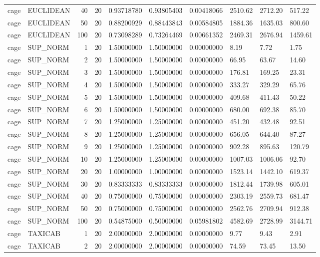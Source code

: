 \begin{longtable}{llrrllllll}
cage & EUCLIDEAN & 40 & 20 & 0.93718780 & 0.93805403 & 0.00418066 & 2510.62 & 2712.20 & 517.22 \\
cage & EUCLIDEAN & 50 & 20 & 0.88200929 & 0.88443843 & 0.00584805 & 1884.36 & 1635.03 & 800.60 \\
cage & EUCLIDEAN & 100 & 20 & 0.73098289 & 0.73264469 & 0.00661352 & 2469.31 & 2676.94 & 1459.61 \\
cage & SUP\_NORM & 1 & 20 & 1.50000000 & 1.50000000 & 0.00000000 & 8.19 & 7.72 & 1.75 \\
cage & SUP\_NORM & 2 & 20 & 1.50000000 & 1.50000000 & 0.00000000 & 66.95 & 63.67 & 14.60 \\
cage & SUP\_NORM & 3 & 20 & 1.50000000 & 1.50000000 & 0.00000000 & 176.81 & 169.25 & 23.31 \\
cage & SUP\_NORM & 4 & 20 & 1.50000000 & 1.50000000 & 0.00000000 & 333.27 & 329.29 & 65.76 \\
cage & SUP\_NORM & 5 & 20 & 1.50000000 & 1.50000000 & 0.00000000 & 409.68 & 411.43 & 50.22 \\
cage & SUP\_NORM & 6 & 20 & 1.50000000 & 1.50000000 & 0.00000000 & 680.00 & 692.38 & 85.70 \\
cage & SUP\_NORM & 7 & 20 & 1.25000000 & 1.25000000 & 0.00000000 & 451.20 & 432.48 & 92.51 \\
cage & SUP\_NORM & 8 & 20 & 1.25000000 & 1.25000000 & 0.00000000 & 656.05 & 644.40 & 87.27 \\
cage & SUP\_NORM & 9 & 20 & 1.25000000 & 1.25000000 & 0.00000000 & 902.28 & 895.63 & 120.79 \\
cage & SUP\_NORM & 10 & 20 & 1.25000000 & 1.25000000 & 0.00000000 & 1007.03 & 1006.06 & 92.70 \\
cage & SUP\_NORM & 20 & 20 & 1.00000000 & 1.00000000 & 0.00000000 & 1523.14 & 1442.10 & 619.37 \\
cage & SUP\_NORM & 30 & 20 & 0.83333333 & 0.83333333 & 0.00000000 & 1812.44 & 1739.98 & 605.01 \\
cage & SUP\_NORM & 40 & 20 & 0.75000000 & 0.75000000 & 0.00000000 & 2303.19 & 2559.73 & 681.47 \\
cage & SUP\_NORM & 50 & 20 & 0.75000000 & 0.75000000 & 0.00000000 & 2562.76 & 2709.94 & 912.38 \\
cage & SUP\_NORM & 100 & 20 & 0.54875000 & 0.50000000 & 0.05981802 & 4582.69 & 2728.99 & 3144.71 \\
cage & TAXICAB & 1 & 20 & 2.00000000 & 2.00000000 & 0.00000000 & 9.77 & 9.43 & 2.91 \\
cage & TAXICAB & 2 & 20 & 2.00000000 & 2.00000000 & 0.00000000 & 74.59 & 73.45 & 13.50 \\

\end{longtable}
